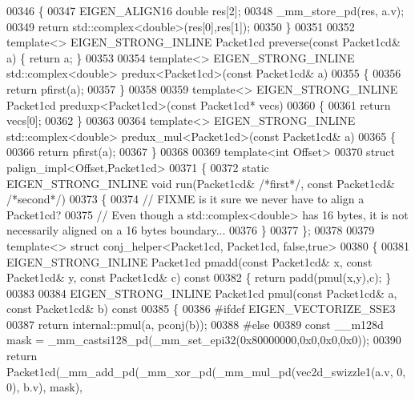 \begin{DoxyCode}
00346 \{
00347   EIGEN\_ALIGN16 \textcolor{keywordtype}{double} res[2];
00348   \_mm\_store\_pd(res, a.v);
00349   \textcolor{keywordflow}{return} std::complex<double>(res[0],res[1]);
00350 \}
00351 
00352 \textcolor{keyword}{template}<> EIGEN\_STRONG\_INLINE Packet1cd preverse(\textcolor{keyword}{const} Packet1cd& a) \{ \textcolor{keywordflow}{return} a; \}
00353 
00354 \textcolor{keyword}{template}<> EIGEN\_STRONG\_INLINE std::complex<double> predux<Packet1cd>(\textcolor{keyword}{const} Packet1cd& a)
00355 \{
00356   \textcolor{keywordflow}{return} pfirst(a);
00357 \}
00358 
00359 \textcolor{keyword}{template}<> EIGEN\_STRONG\_INLINE Packet1cd preduxp<Packet1cd>(\textcolor{keyword}{const} Packet1cd* vecs)
00360 \{
00361   \textcolor{keywordflow}{return} vecs[0];
00362 \}
00363 
00364 \textcolor{keyword}{template}<> EIGEN\_STRONG\_INLINE std::complex<double> predux\_mul<Packet1cd>(\textcolor{keyword}{const} Packet1cd& a)
00365 \{
00366   \textcolor{keywordflow}{return} pfirst(a);
00367 \}
00368 
00369 \textcolor{keyword}{template}<\textcolor{keywordtype}{int} Offset>
00370 \textcolor{keyword}{struct }palign\_impl<Offset,Packet1cd>
00371 \{
00372   \textcolor{keyword}{static} EIGEN\_STRONG\_INLINE \textcolor{keywordtype}{void} run(Packet1cd& \textcolor{comment}{/*first*/}, \textcolor{keyword}{const} Packet1cd& \textcolor{comment}{/*second*/})
00373   \{
00374     \textcolor{comment}{// FIXME is it sure we never have to align a Packet1cd?}
00375     \textcolor{comment}{// Even though a std::complex<double> has 16 bytes, it is not necessarily aligned on a 16 bytes
       boundary...}
00376   \}
00377 \};
00378 
00379 \textcolor{keyword}{template}<> \textcolor{keyword}{struct }conj\_helper<Packet1cd, Packet1cd, false,true>
00380 \{
00381   EIGEN\_STRONG\_INLINE Packet1cd pmadd(\textcolor{keyword}{const} Packet1cd& x, \textcolor{keyword}{const} Packet1cd& y, \textcolor{keyword}{const} Packet1cd& c)\textcolor{keyword}{ const}
00382 \textcolor{keyword}{  }\{ \textcolor{keywordflow}{return} padd(pmul(x,y),c); \}
00383 
00384   EIGEN\_STRONG\_INLINE Packet1cd pmul(\textcolor{keyword}{const} Packet1cd& a, \textcolor{keyword}{const} Packet1cd& b)\textcolor{keyword}{ const}
00385 \textcolor{keyword}{  }\{
00386 \textcolor{preprocessor}{    #ifdef EIGEN\_VECTORIZE\_SSE3}
00387     \textcolor{keywordflow}{return} internal::pmul(a, pconj(b));
00388 \textcolor{preprocessor}{    #else}
00389     \textcolor{keyword}{const} \_\_m128d mask = \_mm\_castsi128\_pd(\_mm\_set\_epi32(0x80000000,0x0,0x0,0x0));
00390     \textcolor{keywordflow}{return} Packet1cd(\_mm\_add\_pd(\_mm\_xor\_pd(\_mm\_mul\_pd(vec2d\_swizzle1(a.v, 0, 0), b.v), mask),

\end{DoxyCode}

